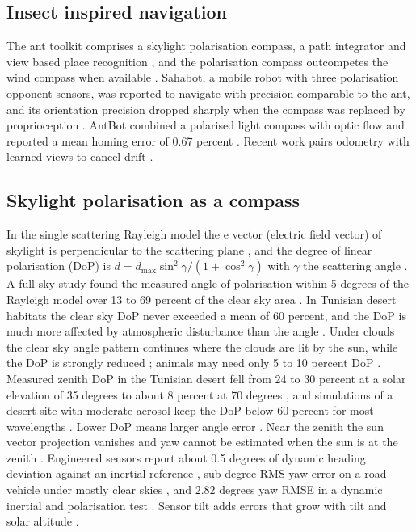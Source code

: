 \documentclass[conference]{IEEEtran}
\begin{document}
\subsection{Insect inspired navigation}
The ant toolkit comprises a skylight polarisation compass, a path integrator and view based place recognition \cite{wehner03}, and the polarisation compass outcompetes the wind compass when available \cite{muller07}. Sahabot, a mobile robot with three polarisation opponent sensors, was reported to navigate with precision comparable to the ant, and its orientation precision dropped sharply when the compass was replaced by proprioception \cite{lambrinos, labhart}. AntBot combined a polarised light compass with optic flow and reported a mean homing error of 0.67 percent \cite{antbot}. Recent work pairs odometry with learned views to cancel drift \cite{gattaux, firlefyn}.

\subsection{Skylight polarisation as a compass}
In the single scattering Rayleigh model the e vector (electric field vector) of skylight is perpendicular to the scattering plane \cite{suhai}, and the degree of linear polarisation (DoP) is $d = d_{\max}\sin^2\gamma/(1+\cos^2\gamma)$ with $\gamma$ the scattering angle \cite{liang}. A full sky study found the measured angle of polarisation within 5 degrees of the Rayleigh model over 13 to 69 percent of the clear sky area \cite{suhai}. In Tunisian desert habitats the clear sky DoP never exceeded a mean of 60 percent, and the DoP is much more affected by atmospheric disturbance than the angle \cite{horvath}. Under clouds the clear sky angle pattern continues where the clouds are lit by the sun, while the DoP is strongly reduced \cite{pomozi}; animals may need only 5 to 10 percent DoP \cite{pomozi}. Measured zenith DoP in the Tunisian desert fell from 24 to 30 percent at a solar elevation of 35 degrees to about 8 percent at 70 degrees \cite{horvath}, and simulations of a desert site with moderate aerosol keep the DoP below 60 percent for most wavelengths \cite{pust}. Lower DoP means larger angle error \cite{ma15}. Near the zenith the sun vector projection vanishes and yaw cannot be estimated when the sun is at the zenith \cite{liang20b, hu22}. Engineered sensors report about 0.5 degrees of dynamic heading deviation against an inertial reference \cite{wang19}, sub degree RMS yaw error on a road vehicle under mostly clear skies \cite{potter}, and 2.82 degrees yaw RMSE in a dynamic inertial and polarisation test \cite{hu22}. Sensor tilt adds errors that grow with tilt and solar altitude \cite{liang}.
\end{document}
